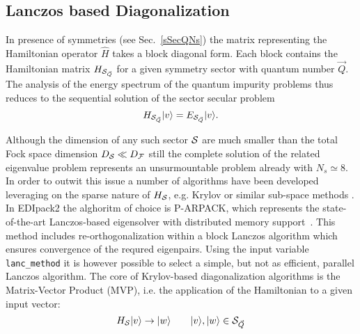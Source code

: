 \documentclass[final,3p,10pt]{elsarticle}
\newcommand{\secu}[1]
{Sec.~\ref{#1}}
\newcommand{\ket}[1]
{|#1\rangle}
\def\a{\alpha}       \def\b{\beta}   \def\g{\gamma}   \def\d{\delta}
\def\e{\varepsilon}  \def\z{\zeta}   \def\h{\eta}     \def\th{\theta}
\def\NAME{{\rm EDIpack2 }}
\begin{document}

\subsection{Lanczos based Diagonalization}\label{sSecHam}
In presence of symmetries (see \secu{sSecQNs}) the matrix representing
the Hamiltonian operator $\hat{H}$ takes a block diagonal form. Each block
contains the Hamiltonian matrix $H_{{\cal S}_{\vec{Q}}}$ for a
given symmetry sector with quantum number $\vec{Q}$.
The analysis of the energy spectrum of the quantum impurity problems
thus reduces to the sequential solution of the sector secular problem
$$
H_{\SS_{\vec{Q}}}\ket{v}=E_{\SS_{\vec{Q}}}\ket{v}.
$$

Although the dimension of any such sector ${\cal S}$ are much smaller than the
total Fock space dimension $D_{\cal S} \ll D_{\cal F}$ still the complete solution of
the related eigenvalue problem represents an unsurmountable problem
already with $N_s\simeq 8$. 
In order to outwit this issue a number of
algorithms have been developed leveraging on the sparse nature of
$H_{\cal S}$, e.g. Krylov or similar sub-space methods \cite{Lanczos,Arnoldi,Feast}.   
In \NAME the alghoritm of choice is P-ARPACK, which represents the
state-of-the-art Lanczos-based eigensolver with distributed memory
support~\cite{P-Arpack}. This method includes re-orthogonalization
within a block Lanczos algorithm which ensures convergence of the
requred eigenpairs. Using the input variable {\tt lanc\_method} it is
however possible to select a simple, but not as efficient, parallel
Lanczos algorithm.
The core of Krylov-based diagonalization algorithms is the Matrix-Vector Product
(MVP), i.e. the application of the Hamiltonian to a given input
vector:
$$
H_\SS \ket{v} \to \ket{w}\qquad \ket{v},\ket{w}\in \SS_{\vec{Q}}
$$
\end{document}

